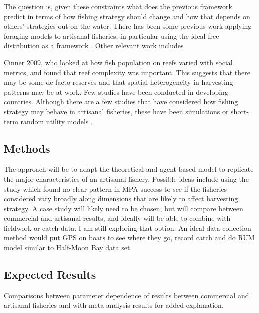 \documentclass[12pt,a4paper]{report}
\begin{document}
The question is, given these constraints what does the previous framework predict in terms of how fishing strategy should change and how that depends on others' strategies out on the water. There has been some previous work applying foraging models to artisanal fisheries, in particular using the ideal free distribution as a framework \citep{Abernethyetal:2007, Aswani:1998}. Other relevant work includes {Cinner 2009, who looked at how fish population on reefs varied with social metrics, and found that reef complexity was important. This suggests that there may be some de-facto reserves and that spatial heterogeneity in harvesting patterns may be at work. Few studies have been conducted in developing countries. Although there are a few studies that have considered how fishing strategy may behave in artisanal fisheries, these have been simulations or short-term random utility models \citep{LaloeSamba:1991, BeneTewfik:2001, Daw:2008}. 

\subsection{Methods}
The approach will be to adapt the theoretical and agent based model to replicate the major characteristics of an  artisanal fishery. Possible ideas include using the \citep{Pollnacetal:2010} study which found no clear pattern in MPA success to see if the fisheries considered vary broadly along dimensions that are likely to affect harvesting strategy. A case study will likely need to be chosen, but will compare between commercial and artisanal results, and ideally will be able to combine with fieldwork or catch data. I am still exploring that option. An ideal data collection method would put GPS on boats to see where they go, record catch and do RUM model similar to Half-Moon Bay data set. 

\subsection{Expected Results}
Comparisons between parameter dependence of results between commercial and artisanal fisheries and with meta-analysis results for added explanation. 

}
\end{document}
